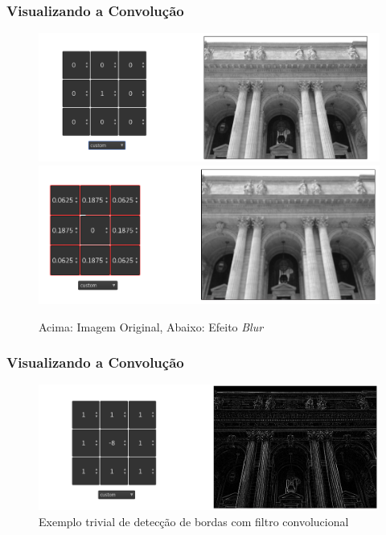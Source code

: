 \documentclass[tikz,10pt]{beamer}
\begin{document}
\begin{frame}
	\frametitle{Visualizando a Convolução}
	\centering
	\begin{figure}
		\centering
		\includegraphics[width=0.7\linewidth]{images/convolucao/001_sem_filtro} \\
		\includegraphics[width=0.7\linewidth]{images/convolucao/002_blur}		
		\caption{Acima: Imagem Original, Abaixo: Efeito \textit{Blur}}
		\label{fig:orig_blur}
	\end{figure}
	
\end{frame}


\begin{frame}
	\frametitle{Visualizando a Convolução}
	\centering
	\begin{figure}
		\centering
		\includegraphics[width=1.0\linewidth]{images/convolucao/006_edge_det}		
		\caption{Exemplo trivial de detecção de bordas com filtro convolucional}
		\label{fig:orig_blur}
	\end{figure}
	
\end{frame}
\end{document}
